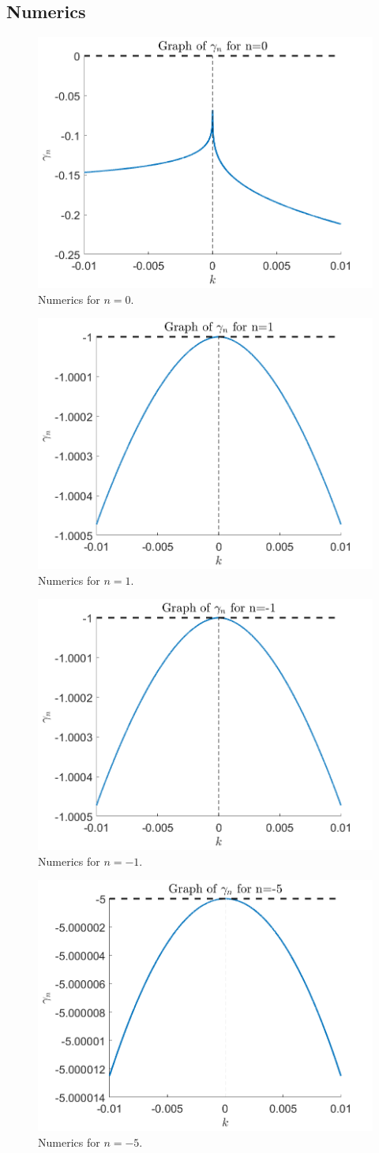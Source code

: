 \documentclass[]{article}
\begin{document}
	\subsection{Numerics}
	\begin{figure}
		\centering
		\includegraphics[width = .5\textwidth]{../Numerics/Images/gamma_n0}
		\caption{Numerics for $n = 0$.}
	\end{figure}
	\begin{figure}
		\centering
		\includegraphics[width = .5\textwidth]{../Numerics/Images/gamma_n1}
		\caption{Numerics for $n = 1$.}
	\end{figure}
		\begin{figure}
		\centering
		\includegraphics[width = .5\textwidth]{../Numerics/Images/gamma_n-1}
		\caption{Numerics for $n = -1$.}
	\end{figure}
	\begin{figure}
		\centering
		\includegraphics[width = .5\textwidth]{../Numerics/Images/gamma_n-5}
		\caption{Numerics for $n = -5$.}
	\end{figure}
\end{document}
